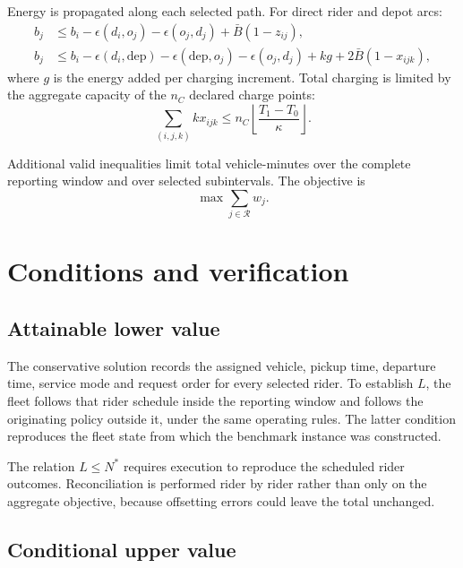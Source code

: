 Energy is propagated along each selected path. For direct rider and depot arcs:
\begin{align}
  b_j &\leq b_i-\epsilon(d_i,o_j)-\epsilon(o_j,d_j)+\bar B(1-z_{ij}), \\
  b_j &\leq b_i-\epsilon(d_i,\mathrm{dep})-\epsilon(\mathrm{dep},o_j)
        -\epsilon(o_j,d_j)+kg+2\bar B(1-x_{ijk}),
  \label{eq:energy}
\end{align}
where $g$ is the energy added per charging increment. Total charging is limited by the aggregate
capacity of the $n_C$ declared charge points:
\begin{equation}
  \textstyle\sum_{(i,j,k)}k x_{ijk}
  \leq n_C\left\lfloor\frac{T_1-T_0}{\kappa}\right\rfloor.
  \label{eq:charging}
\end{equation}

Additional valid inequalities limit total vehicle-minutes over the complete reporting window and over
selected subintervals. The objective is
\begin{equation}
  \max \textstyle\sum_{j\in\mathcal R} w_j.
  \label{eq:mip-objective}
\end{equation}


\section{Conditions and verification}
\label{sec:conditions}

\subsection{Attainable lower value}

The conservative solution records the assigned vehicle, pickup time, departure time, service mode and
request order for every selected rider. To establish $L$, the fleet follows that rider schedule inside
the reporting window and follows the originating policy outside it, under the same operating rules.
The latter condition reproduces the fleet state from which the benchmark instance was constructed.

The relation $L\leq N^*$ requires execution to reproduce the scheduled rider outcomes. Reconciliation
is performed rider by rider rather than only on the aggregate objective, because offsetting errors
could leave the total unchanged.

\subsection{Conditional upper value}

